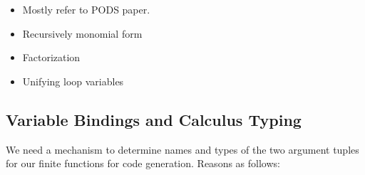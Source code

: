 
\begin{itemize}
  \item Mostly refer to PODS paper.
\end{itemize}

\begin{itemize}
  \item Recursively monomial form
  \item Factorization
  \item Unifying loop variables
\end{itemize}



\subsection{Variable Bindings and Calculus Typing}

\noindent We need a mechanism to determine names and types of the two argument
tuples for our finite functions for code generation. Reasons as follows:

